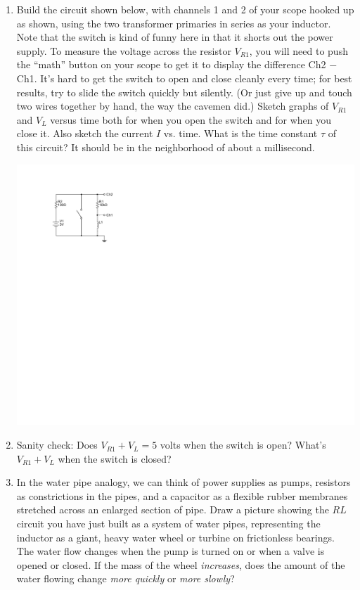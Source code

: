 \begin{enumerate}[wide]
\item Build the circuit shown below, with channels 1 and 2 of your scope hooked up as shown, using the two transformer primaries in series as your inductor.  Note that the switch is kind of funny here in that it shorts out the power supply.  To measure the voltage across the resistor $V_{R1}$, you will need to push the ``math'' button on your scope to get it to display the difference Ch2 $-$ Ch1.  It's hard to get the switch to open and close cleanly every time; for best results, try to slide the switch quickly but silently.  (Or just give up and touch two wires together by hand, the way the cavemen did.)  Sketch graphs of $V_{R1}$ and $V_L$ versus time both for when you open the switch and for when you close it.   Also sketch the current $I$ vs. time.  What is the time constant $\tau$ of this circuit?  It should be in the neighborhood of about a millisecond.  \label{part_rl_constant}
\begin{center}
\includegraphics{inductors/single_dc_inductor.pdf}
\end{center}

\item Sanity check: Does $V_{R1} +V_L = 5$ volts when the switch is open?  What's $V_{R1} +V_L$ when the switch is closed?

\item In the water pipe analogy, we can think of power supplies as pumps, resistors as constrictions in the pipes, and a capacitor as a flexible rubber membranes stretched across an enlarged section of pipe.  Draw a picture showing the $RL$ circuit you have just built as a system of water pipes, representing the inductor as a giant, heavy water wheel or turbine on frictionless bearings.  
The water flow changes when the pump is turned on or when a valve is opened or closed.
If the mass of the wheel \textit{increases}, does the amount of the water flowing change \textit{more quickly} or \textit{more slowly}?


\end{enumerate}
